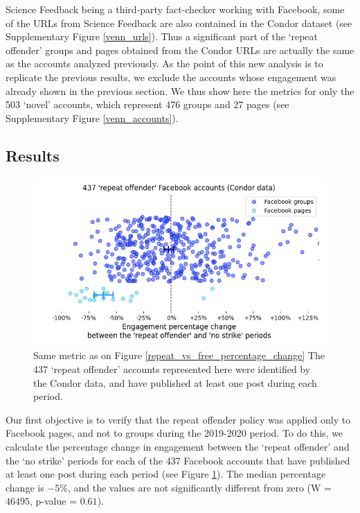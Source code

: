 \documentclass[review]{elsarticle}
\begin{document}
Science Feedback being a third-party fact-checker working with Facebook, some of the URLs from Science Feedback are also contained in the Condor dataset (see Supplementary Figure \ref{venn_urls}). 
Thus a significant part of the `repeat offender' groups and pages obtained from the Condor URLs are actually the same as the accounts analyzed previously. 
As the point of this new analysis is to replicate the previous results, we exclude the accounts whose engagement was already shown in the previous section. 
We thus show here the metrics for only the 503 `novel' accounts, which represent 476 groups and 27 pages (see Supplementary Figure \ref{venn_accounts}).

\subsection{Results}

\begin{figure}[!h]
\centering
\includegraphics[scale=0.5]{./../figure/condor_repeat_vs_free_percentage_change.png}
\caption{
Same metric as on Figure \ref{repeat_vs_free_percentage_change}
The 437 `repeat offender' accounts represented here were identified by the Condor data, and have published at least one post during each period.
}
\label{condor_repeat_vs_free_percentage_change}
\end{figure}

Our first objective is to verify that the repeat offender policy was applied only to Facebook pages, and not to groups during the 2019-2020 period.
To do this, we calculate the percentage change in engagement between the `repeat offender' and the `no strike' periods for each of the 437 Facebook accounts that have published at least one post during each period (see Figure \ref{condor_repeat_vs_free_percentage_change}). 
The median percentage change is $-5\%$, and the values are not significantly different from zero (W = $46495$, p-value = $0.61$).
\end{document}
